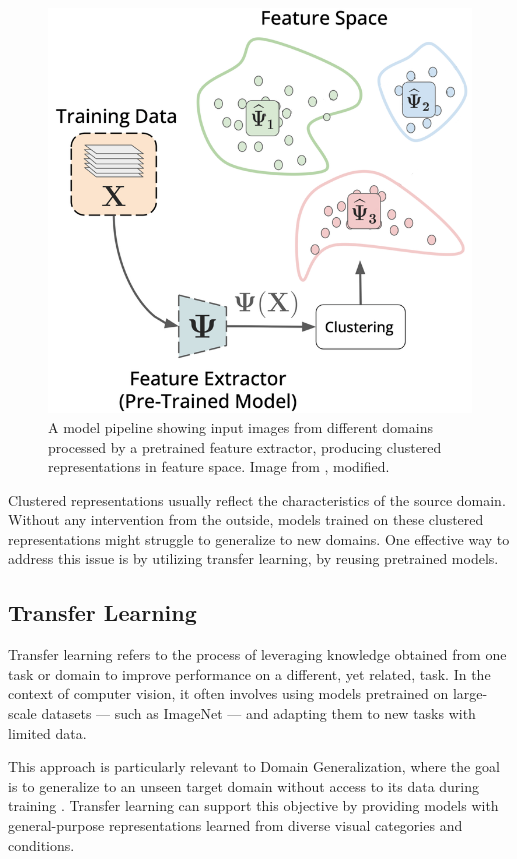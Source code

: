 \begin{figure}[!htb]
    \centering
    \includegraphics[height=0.25\textheight]{images/Pipeline-Feature_Space.png}
    \caption{A model pipeline showing input images from different domains processed by a pretrained feature extractor, producing clustered representations in feature space. Image from \cite{thomasWhatsLatentLeveraging2025}, modified.}
    \label{fig:Pipeline_Feature_Space}
\end{figure}
Clustered representations usually reflect the characteristics of the source domain. Without any intervention from the outside, models trained on these clustered representations might struggle to generalize to new domains.
One effective way to address this issue is by utilizing transfer learning, by reusing pretrained models.
\subsection{Transfer Learning}
Transfer learning refers to the process of leveraging knowledge obtained from one task or domain to improve performance on a different, yet related, task. In the context of computer vision, it often involves using models pretrained on large-scale datasets — such as ImageNet — and adapting them to new tasks with limited data.

This approach is particularly relevant to Domain Generalization, where the goal is to generalize to an unseen target domain without access to its data during training \cite{gulrajaniSearchLostDomain2020,liDeeperBroaderArtier2017}. Transfer learning can support this objective by providing models with general-purpose representations learned from diverse visual categories and conditions.

